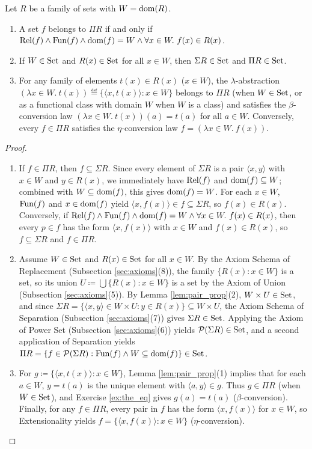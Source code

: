 \documentclass[10pt,a4paper]{article}
\renewcommand{\myprf}{\begin{proof}}
\renewcommand{\myqed}{\end{proof}}
\begin{document}
\begin{lemma}\label{lem:sigma_pi}
Let $R$ be a family of sets with $W = {\textrm{dom}}(R)$.
\begin{enumerate}
\item A set $f$ belongs to $\Pi R$ if and only if ${\textrm{Rel}}(f) \land {\textrm{Fun}}(f) \land {\textrm{dom}}(f) = W \land \forall x \in W.\ f(x) \in R(x)$.
\item If $W \in {\textrm{Set}}$ and $R(x) \in {\textrm{Set}}$ for all $x \in W$, then $\Sigma R \in {\textrm{Set}}$ and $\Pi R \in {\textrm{Set}}$.
\item For any family of elements $t(x) \in R(x)$ ($x \in W$), the $\lambda$-abstraction $(\lambda x \in W.\ t(x)) \eqdef \{\langle x, t(x) \rangle : x \in W\}$ belongs to $\Pi R$ (when $W \in {\textrm{Set}}$, or as a functional class with domain $W$ when $W$ is a class) and satisfies the $\beta$-conversion law $(\lambda x \in W.\ t(x))(a) = t(a)$ for all $a \in W$. Conversely, every $f \in \Pi R$ satisfies the $\eta$-conversion law $f = (\lambda x \in W.\ f(x))$.
\end{enumerate}
\end{lemma}
\myprf
\begin{enumerate}
\item If $f \in \Pi R$, then $f \subseteq \Sigma R$. Since every element of $\Sigma R$ is a pair $\langle x, y \rangle$ with $x \in W$ and $y \in R(x)$, we immediately have ${\textrm{Rel}}(f)$ and ${\textrm{dom}}(f) \subseteq W$; combined with $W \subseteq {\textrm{dom}}(f)$, this gives ${\textrm{dom}}(f) = W$. For each $x \in W$, ${\textrm{Fun}}(f)$ and $x \in {\textrm{dom}}(f)$ yield $\langle x, f(x) \rangle \in f \subseteq \Sigma R$, so $f(x) \in R(x)$. Conversely, if ${\textrm{Rel}}(f) \land {\textrm{Fun}}(f) \land {\textrm{dom}}(f) = W \land \forall x \in W.\ f(x) \in R(x)$, then every $p \in f$ has the form $\langle x, f(x) \rangle$ with $x \in W$ and $f(x) \in R(x)$, so $f \subseteq \Sigma R$ and $f \in \Pi R$.
\item Assume $W \in {\textrm{Set}}$ and $R(x) \in {\textrm{Set}}$ for all $x \in W$. By the Axiom Schema of Replacement (Subsection \ref{sec:axioms}(8)), the family $\{R(x) : x \in W\}$ is a set, so its union $U \coloneqq \bigcup \{R(x) : x \in W\}$ is a set by the Axiom of Union (Subsection \ref{sec:axioms}(5)). By Lemma \ref{lem:pair_prop}(2), $W \times U \in {\textrm{Set}}$, and since $\Sigma R = \{\langle x, y \rangle \in W \times U : y \in R(x)\} \subseteq W \times U$, the Axiom Schema of Separation (Subsection \ref{sec:axioms}(7)) gives $\Sigma R \in {\textrm{Set}}$. Applying the Axiom of Power Set (Subsection \ref{sec:axioms}(6)) yields ${\mathcal{P}}(\Sigma R) \in {\textrm{Set}}$, and a second application of Separation yields $\Pi R = \{f \in {\mathcal{P}}(\Sigma R) : {\textrm{Fun}}(f) \land W \subseteq {\textrm{dom}}(f)\} \in {\textrm{Set}}$.
\item For $g \coloneqq \{\langle x, t(x) \rangle : x \in W\}$, Lemma \ref{lem:pair_prop}(1) implies that for each $a \in W$, $y = t(a)$ is the unique element with $\langle a, y \rangle \in g$. Thus $g \in \Pi R$ (when $W \in {\textrm{Set}}$), and Exercise \ref{ex:the_eq} gives $g(a) = t(a)$ ($\beta$-conversion). Finally, for any $f \in \Pi R$, every pair in $f$ has the form $\langle x, f(x) \rangle$ for $x \in W$, so Extensionality yields $f = \{\langle x, f(x) \rangle : x \in W\}$ ($\eta$-conversion).
\end{enumerate}
\myqed
\end{document}
